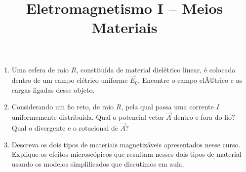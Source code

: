 \newif\ifuseseminar
\useseminartrue


\title{Eletromagnetismo I -- Meios Materiais}	



\begin{enumerate}
	\item Uma esfera de raio $R$, constituída de material dielétrico linear, é
	      colocada dentro de um campo elétrico uniforme $\vec{E}_0$. Encontre o campo
	      elÃ©trico e as cargas ligadas desse objeto.
	\item Considerando um fio reto, de raio $R$, pela qual passa uma corrente $I$
	      uniformemente distribuída. Qual o potencial vetor $\vec{A}$ dentro e fora do
	      fio? Qual o divergente e o rotacional de $\vec{A}$?
	\item Descreva os dois tipos de materiais magnetizáveis apresentados nesse curso.
	      Explique os efeitos microscópicos que resultam nesses dois tipos de material
	      usando os modelos simplificados  que discutimos em aula.
\end{enumerate}

